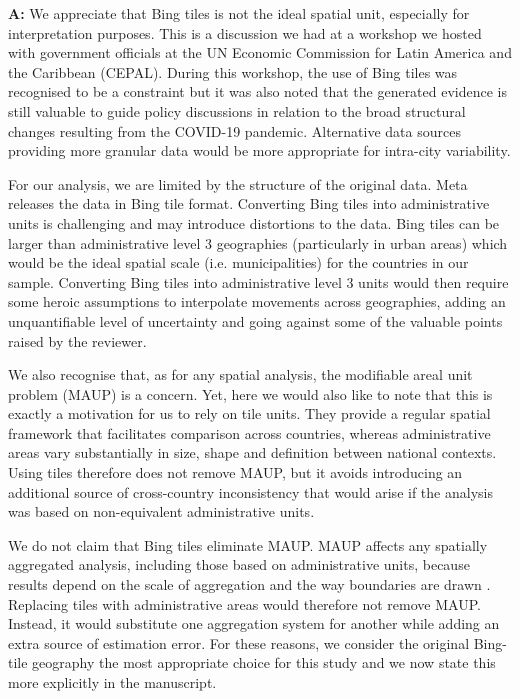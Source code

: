 \documentclass[12pt,a4paper,oneside, reqno]{amsart}
\begin{document}
\setlength{\leftskip}{1cm}\textbf{A:} We appreciate that Bing tiles is not the ideal spatial unit, especially for interpretation purposes. This is a discussion we had at a workshop we hosted with government officials at the UN Economic Commission for Latin America and the Caribbean (CEPAL). During this workshop, the use of Bing tiles was recognised to be a constraint but it was also noted that the generated evidence is still valuable to guide policy discussions in relation to the broad structural changes resulting from the COVID-19 pandemic. Alternative data sources providing more granular data would be more appropriate for intra-city variability.

For our analysis, we are limited by the structure of the original data. Meta releases the data in Bing tile format. Converting Bing tiles into administrative units is challenging and may introduce distortions to the data. Bing tiles can be larger than administrative level 3 geographies (particularly in urban areas) which would be the ideal spatial scale (i.e. municipalities) for the countries in our sample. Converting Bing tiles into administrative level 3 units would then require some heroic assumptions to interpolate movements across geographies, adding an unquantifiable level of uncertainty and going against some of the valuable points raised by the reviewer. 

We also recognise that, as for any spatial analysis, the modifiable areal unit problem (MAUP) is a concern. Yet, here we would also like to note that this is exactly a motivation for us to rely on tile units. They provide a regular spatial framework that facilitates comparison across countries, whereas administrative areas vary substantially in size, shape and definition between national contexts. Using tiles therefore does not remove MAUP, but it avoids introducing an additional source of cross-country inconsistency that would arise if the analysis was based on non-equivalent administrative units.

We do not claim that Bing tiles eliminate MAUP. MAUP affects any spatially aggregated analysis, including those based on administrative units, because results depend on the scale of aggregation and the way boundaries are drawn \parencite{openshaw83}. Replacing tiles with administrative areas would therefore not remove MAUP. Instead, it would substitute one aggregation system for another while adding an extra source of estimation error. For these reasons, we consider the original Bing-tile geography the most appropriate choice for this study and we now state this more explicitly in the manuscript.
\end{document}
